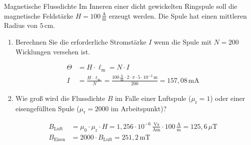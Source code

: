 \begin{frame} 
	\begin{bsp}{Magnetische Flussdichte}{}
		Im Inneren einer dicht gewickelten Ringspule soll die magnetische Feldstärke $H=100\,\frac{\mathrm{A}}{\mathrm{m}}$ erzeugt werden. Die Spule hat einen mittleren Radius von $5\,\mathrm{cm}$.
		\begin{enumerate}
			\item Berechnen Sie die erforderliche Stromstärke $I$ wenn die Spule mit $N=200$ Wicklungen versehen ist.\pause
			      
			      \begin{align*}
				      \varTheta & = H \cdot \ell_{\mathrm{m}} = N\cdot I                                                                                                                  \\
				      I         & =\frac{H\cdot\ell_{\mathrm{m}}}{N}=\frac{100\,\frac{\mathrm{A}}{\mathrm{m}}\cdot 2\cdot \pi\cdot 5\cdot 10^{-2}\,\mathrm{m}}{200} = 157,08\,\mathrm{mA}
			      \end{align*}\pause
			\item Wie groß wird die Flussdichte $B$ im Falle einer Luftspule ($\mu_{\mathrm{r}}=1$) oder einer eisengefüllten Spule ($\mu_{\mathrm{r}}=2000$ im Arbeitspunkt)?\pause
			      
			      \begin{align*}
				      B_\mathrm{Luft}  & = \mu_0\cdot \mu_{\mathrm{r}}\cdot H = 1,256\cdot10^{-6}\,\tfrac{\mathrm{Vs}}{\mathrm{Am}} \cdot 100\,\tfrac{\mathrm{A}}{\mathrm{m}} = 125,6\,\mu\mathrm{T} \\
				      B_\mathrm{Eisen} & = 2000\cdot B_\mathrm{Luft} = 251,2\,\mathrm{mT}
			      \end{align*}
		\end{enumerate}
	\end{bsp}
\end{frame}

